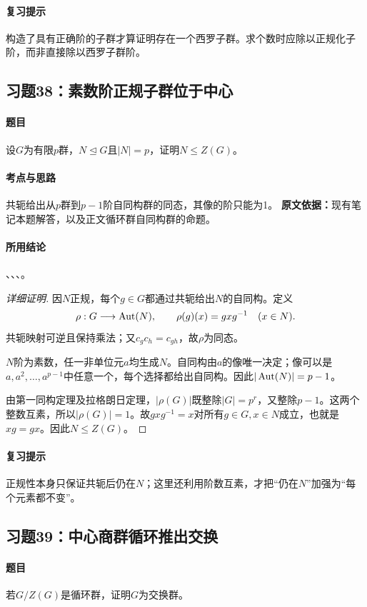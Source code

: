 \paragraph{复习提示}构造了具有正确阶的子群才算证明存在一个西罗子群。求个数时应除以正规化子阶，而非直接除以西罗子群阶。

\subsection{习题38：素数阶正规子群位于中心}
\paragraph{题目}设$G$为有限$p$群，$N\trianglelefteq G$且$|N|=p$，证明$N\le Z(G)$。
\paragraph{考点与思路}共轭给出从$p$群到$p-1$阶自同构群的同态，其像的阶只能为1。
\textbf{原文依据：}现有笔记本题解答，以及正文循环群自同构群的命题。
\paragraph{所用结论}、、、。
\begin{proof}[详细证明]
因$N$正规，每个$g\in G$都通过共轭给出$N$的自同构。定义
\[
\rho:G\longrightarrow\operatorname{Aut}(N),\qquad
\rho(g)(x)=gxg^{-1}\quad(x\in N).
\]
共轭映射可逆且保持乘法；又$c_gc_h=c_{gh}$，故$\rho$为同态。

$N$阶为素数，任一非单位元$a$均生成$N$。自同构由$a$的像唯一决定；像可以是$a,a^2,\ldots,a^{p-1}$中任意一个，每个选择都给出自同构。因此$|\operatorname{Aut}(N)|=p-1$。

由第一同构定理及拉格朗日定理，$|\rho(G)|$既整除$|G|=p^r$，又整除$p-1$。这两个整数互素，所以$|\rho(G)|=1$。故$gxg^{-1}=x$对所有$g\in G,x\in N$成立，也就是$xg=gx$。因此$N\le Z(G)$。
\end{proof}
\paragraph{复习提示}正规性本身只保证共轭后仍在$N$；这里还利用阶数互素，才把“仍在$N$”加强为“每个元素都不变”。

\subsection{习题39：中心商群循环推出交换}
\paragraph{题目}若$G/Z(G)$是循环群，证明$G$为交换群。
